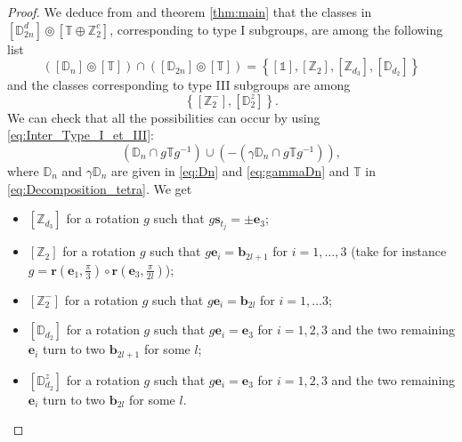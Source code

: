 \documentclass[11pt,a4paper]{amsart}
\theoremstyle{definition}
\newcommand{\ZZ}{\mathbb{Z}}                %
\newcommand{\tetra}{\mathbb{T}}             %
\newcommand{\DD}{\mathbb{D}}                %
\newcommand{\1}{\mathds{1}}		            %
\newcommand{\ee}{\pmb{e}}                   %
\newcommand{\vR}{\mathbf{r}}
\newcommand{\bb}{\mathbf{b}}
\newcommand{\set}[1]{\left\{#1\right\}}     %
\begin{document}
\begin{proof}
	We deduce from \cite[table 1]{Olive2019} and theorem \ref{thm:main} that the classes in $[\DD_{2n}^d]\circledcirc [\tetra\oplus \ZZ_2^c]$, corresponding to type I subgroups, are among the following list
\begin{equation*}
([\DD_n]\circledcirc [\tetra])\cap ([\DD_{2n}]\circledcirc[\tetra])=\set{[\1],[\ZZ_{2}],[\ZZ_{d_3}],[\DD_{d_2}]}
\end{equation*}
and the classes corresponding to type III subgroups are among
\begin{equation*}
\set{[\ZZ_2^-],[\DD_{2}^z]}.
\end{equation*}
We can check that all the possibilities can occur by using \eqref{eq:Inter_Type_I_et_III}:
\begin{equation*}
(\DD_n\cap g \tetra g^{-1})\cup (-(\gamma\DD_n\cap g \tetra g^{-1})),
\end{equation*}
where $\DD_n$ and $ \gamma\DD_n$ are given in \eqref{eq:Dn} and \eqref{eq:gammaDn} and $\tetra$ in \eqref{eq:Decomposition_tetra}.
We get
\begin{itemize}
	\item $[\ZZ_{d_3}]$ for a rotation $g$ such that $g\pmb{s}_{t_j}=\pm \ee_3$;
	\item $[\ZZ_{2}]$ for a rotation $g$ such that $g\ee_i= \bb_{2l+1}$ for $i=1,\dotsc,3$ (take for instance $g=\vR\left(\ee_1,\frac{\pi}{3}\right)\circ\vR\left(\ee_3,\frac{\pi}{2l}\right)$);
	\item $[\ZZ_2^-]$ for a rotation $g$ such that $g\ee_i= \bb_{2l}$ for $ i=1,\dotsc 3$;
	\item $[\DD_{d_2}]$ for a rotation $g$ such that $g\ee_i= \ee_3$ for $i=1,2,3$ and the two remaining $\ee_i$ turn to two $\bb_{2l+1}$ for some $l$;
	\item $[\DD_{d_2}^z]$ for a rotation $g$ such that $g\ee_i= \ee_3$ for $i=1,2,3$ and the two remaining $\ee_i$ turn to two $\bb_{2l}$ for some $l$.
\end{itemize}
\end{proof}
\end{document}
